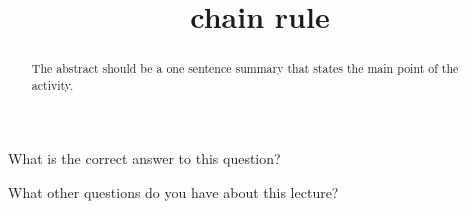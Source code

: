\documentclass{ximera}
\title{chain rule}
\begin{document}
\begin{abstract}
  The abstract should be a one sentence summary that states the main point of the activity.
\end{abstract}

\maketitle

\begin{question}
  What is the correct answer to this question?

  \begin{solution}
    \begin{multiple-choice}
    \end{multiple-choice}  
  \end{solution}
\end{question}

What other questions do you have about this lecture?
\begin{free-response}
\end{free-response}
\end{document}
